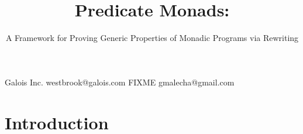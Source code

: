 \documentclass[preprint]{sigplanconf}
\begin{document}




\setlength{\pdfpageheight}{\paperheight}
\setlength{\pdfpagewidth}{\paperwidth}






\title{Predicate Monads:}
\subtitle{A Framework for Proving Generic Properties of Monadic Programs via Rewriting}

           {Galois Inc.}
           {westbrook@galois.com}
           {FIXME}
           {gmalecha@gmail.com}

\maketitle








\section{Introduction}

\end{document}
